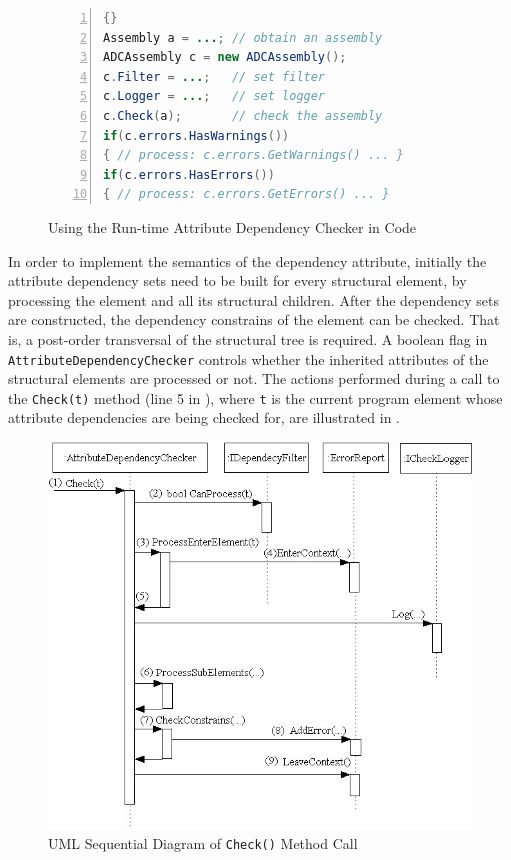 \begin{figure}[ht]
\begin{center}
\begin{minipage}{7cm}
	\begin{scriptsize}
\begin{lstlisting}[numbers=left,language=Java,frame=leftline]{}
Assembly a = ...; // obtain an assembly
ADCAssembly c = new ADCAssembly();
c.Filter = ...;   // set filter
c.Logger = ...;   // set logger
c.Check(a);       // check the assembly
if(c.errors.HasWarnings())
{ // process: c.errors.GetWarnings() ... }
if(c.errors.HasErrors())
{ // process: c.errors.GetErrors() ... }
\end{lstlisting}
  \end{scriptsize}
\end{minipage}
\end{center}
  \caption{Using the Run-time Attribute Dependency Checker in Code}
	\label{fig:using}
 \end{figure}

In order to implement the semantics of the dependency attribute, initially the attribute dependency sets need to be built for every structural element, by processing the element and all its structural children. After the dependency sets are constructed, the dependency constrains of the element can be checked. That is, a post-order transversal of the structural tree is required. A boolean flag in \texttt{Attri\-bute\-De\-pen\-de\-ncy\-Che\-cker} controls whether the inherited attributes of the structural elements are processed or not. 
The actions performed during a call to the \texttt{Check(t)} method (line 5 in ), where \texttt{t} is the current program element whose attribute dependencies are being checked for, are illustrated in . 

\begin{figure}[ht]
	\begin{center}
		\includegraphics[width=12cm,height=!]{ch04b/seq-diag}
	\end{center}
	\caption{UML Sequential Diagram of \texttt{Check()} Method Call}
	\label{fig:seq-diag}
\end{figure}

